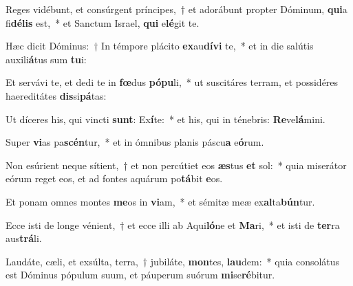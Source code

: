 \item Reges vidébunt, et consúrgent príncipes,~† et adorábunt propter Dóminum, \textbf{qui}a fi\textbf{dé}\textbf{lis} est,~* et Sanctum Israel, \textbf{qui} e\textbf{lé}git te.
\item Hæc dicit Dóminus:~† In témpore plácito \textbf{ex}au\textbf{dí}\textbf{vi} te,~* et in die salútis auxili\textbf{á}tus sum \textbf{tu}i:
\item Et servávi te, et dedi te in \textbf{fœ}dus \textbf{pó}\textbf{pu}li,~* ut suscitáres terram, et possidéres haereditátes \textbf{dis}si\textbf{pá}tas:
\item Ut díceres his, qui vincti \textbf{sunt}: Ex\textbf{í}te:~* et his, qui in ténebris: \textbf{Re}ve\textbf{lá}mini.
\item Super \textbf{vi}as pa\textbf{scén}tur,~* et in ómnibus planis páscu\textbf{a} e\textbf{ó}rum.
\item Non esúrient neque sítient,~† et non percútiet eos \textbf{æs}tus \textbf{et} sol:~* quia miserátor eórum reget eos, et ad fontes aquárum po\textbf{tá}bit \textbf{e}os.
\item Et ponam omnes montes \textbf{me}os in \textbf{vi}am,~* et sémitæ meæ ex\textbf{al}ta\textbf{bún}tur.
\item Ecce isti de longe vénient,~† et ecce illi ab Aqui\textbf{ló}ne et \textbf{Ma}ri,~* et isti de \textbf{ter}ra aus\textbf{trá}li.
\item Laudáte, cæli, et exsúlta, terra,~† jubiláte, \textbf{mon}tes, \textbf{lau}dem:~* quia consolátus est Dóminus pópulum suum, et páuperum suórum \textbf{mi}se\textbf{ré}bitur.
